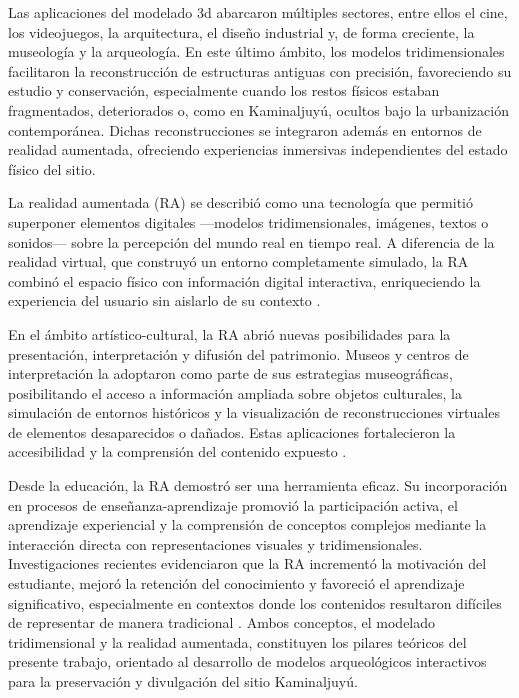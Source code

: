 Las aplicaciones del modelado \gls{3d} abarcaron múltiples sectores, entre ellos el cine, los videojuegos, la arquitectura, el diseño industrial y, de forma creciente, la museología y la arqueología. En este último ámbito, los modelos tridimensionales facilitaron la reconstrucción de estructuras antiguas con precisión, favoreciendo su estudio y conservación, especialmente cuando los restos físicos estaban fragmentados, deteriorados o, como en Kaminaljuyú, ocultos bajo la urbanización contemporánea. Dichas reconstrucciones se integraron además en entornos de realidad aumentada, ofreciendo experiencias inmersivas independientes del estado físico del sitio.

La realidad aumentada (RA) se describió como una tecnología que permitió superponer elementos digitales —modelos tridimensionales, imágenes, textos o sonidos— sobre la percepción del mundo real en tiempo real. A diferencia de la realidad virtual, que construyó un entorno completamente simulado, la RA combinó el espacio físico con información digital interactiva, enriqueciendo la experiencia del usuario sin aislarlo de su contexto \cite{Torres2013}.

En el ámbito artístico-cultural, la RA abrió nuevas posibilidades para la presentación, interpretación y difusión del patrimonio. Museos y centros de interpretación la adoptaron como parte de sus estrategias museográficas, posibilitando el acceso a información ampliada sobre objetos culturales, la simulación de entornos históricos y la visualización de reconstrucciones virtuales de elementos desaparecidos o dañados. Estas aplicaciones fortalecieron la accesibilidad y la comprensión del contenido expuesto \cite{Torres2013}.

Desde la educación, la RA demostró ser una herramienta eficaz. Su incorporación en procesos de enseñanza-aprendizaje promovió la participación activa, el aprendizaje experiencial y la comprensión de conceptos complejos mediante la interacción directa con representaciones visuales y tridimensionales. Investigaciones recientes evidenciaron que la RA incrementó la motivación del estudiante, mejoró la retención del conocimiento y favoreció el aprendizaje significativo, especialmente en contextos donde los contenidos resultaron difíciles de representar de manera tradicional \cite{Barroso2022,Sevilla2017}. Ambos conceptos, el modelado tridimensional y la realidad aumentada, constituyen los pilares teóricos del presente trabajo, orientado al desarrollo de modelos arqueológicos interactivos para la preservación y divulgación del sitio Kaminaljuyú.